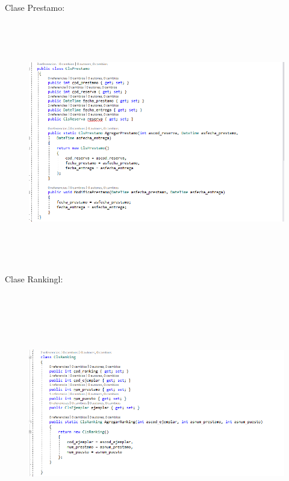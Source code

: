 \documentclass[12pt]{article}
\begin{document}
\begin{enumerate}[label*=\arabic*.]
\begin{enumerate}[label*=\arabic*.]
\newpage
Clase Prestamo:
\begin{figure}[H]
	\begin{Center}
		\includegraphics[width=4.91in,height=4.15in]{./media/10.png}
	\end{Center}
\end{figure}

Clase Rankingl:
\begin{figure}[H]
	\begin{Center}
		\includegraphics[width=4.91in,height=4.15in]{./media/11.png}
	\end{Center}
\end{figure}


\end{enumerate}
\end{enumerate}
\end{document}
